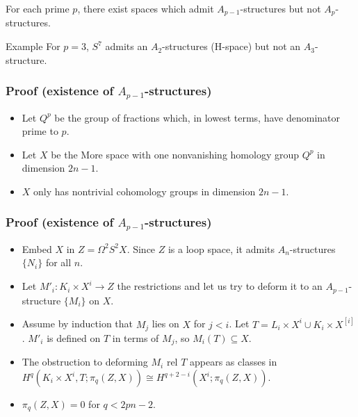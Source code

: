 \documentclass{beamer}
\theoremstyle{definition}
\newcommand{\Z}{\mathbb{Z}}
\begin{document}
\begin{frame}[fragile]
\begin{theorem}
For each prime $p$, there exist spaces which admit $A_{p-1}$-structures but not $A_p$-structures.
\end{theorem}\pause
\begin{block}{Example}
For $p=3$, $S^7$ admits an $A_2$-structures (H-space) but not an $A_3$-structure.
\end{block}
\end{frame}
\begin{frame}
\frametitle{Proof (existence of $A_{p-1}$-structures)}
\begin{itemize}
\item<1-> Let $Q^p$ be the group of fractions which, in lowest terms, have denominator prime to $p$.
\item<2-> Let $X$ be the More space with one nonvanishing homology group $Q^p$ in dimension $2n-1$. %
\item<3-> $X$ only has nontrivial cohomology groups in dimension $2n-1$.
\end{itemize}
\end{frame}
\begin{frame}
\frametitle{Proof (existence of $A_{p-1}$-structures)}
\begin{itemize}
\item<1-> Embed $X$ in $Z=\Omega^2S^2X$. Since $Z$ is a loop space, it admits $A_n$-structures $\{N_i\}$ for all $n$.
\item<2-> Let $M'_i:K_i\times X^i\to Z$ the restrictions and let us try to deform it to an $A_{p-1}$-structure $\{M_i\}$ on $X$.
\item<3-> Assume by induction that $M_j$ lies on $X$ for $j<i$. Let $T=L_i\times X^i\cup K_i\times X^{[i]}$. $M'_i$ is defined on $T$ in terms of $M_j$, so $M_i(T)\subseteq X$.
\item<4-> The obstruction to deforming $M_i$ rel $T$ appears as classes in $H^q(K_i\times X^i,T;\pi_q(Z,X))\cong H^{q+2-i}(X^i;\pi_q(Z,X))$.
\item<5-> $\pi_q(Z,X)=0$ for $q<2pn-2$.

\end{itemize}
\end{frame}
\end{document}
